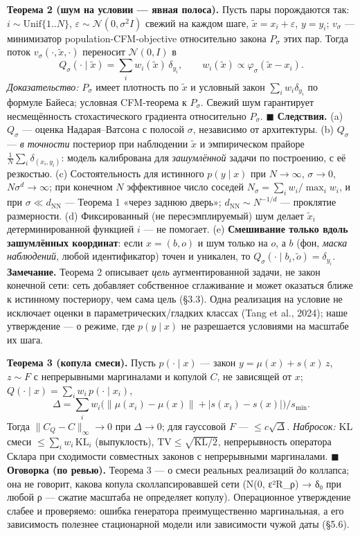 \documentclass[11pt]{article}
\begin{document}
\textbf{Теорема 2 (шум на условии — явная полоса).} Пусть пары порождаются так: $i \sim \mathrm{Unif}\{1..N\}$, $\varepsilon \sim \mathcal N(0, \sigma^2 I)$ свежий на каждом шаге, $\tilde x = x_i + \varepsilon$, $y = y_i$; $v_\sigma$ — минимизатор population-CFM-objective относительно закона $P_\sigma$ этих пар. Тогда поток $v_\sigma(\cdot, \tilde x, \cdot)$ переносит $\mathcal N(0, I)$ в \[Q_\sigma(\cdot\mid\tilde x) = \sum_i w_i(\tilde x)\,\delta_{y_i},\qquad w_i(\tilde x) \propto \varphi_\sigma(\tilde x - x_i).\] \emph{Доказательство:} $P_\sigma$ имеет плотность по $\tilde x$ и условный закон $\sum_i w_i \delta_{y_i}$ по формуле Байеса; условная CFM-теорема к $P_\sigma$. Свежий шум гарантирует несмещённость стохастического градиента относительно $P_\sigma$. $\blacksquare$ \textbf{Следствия.} (a) $Q_\sigma$ — оценка Надарая–Ватсона с полосой $\sigma$, независимо от архитектуры. (b) $Q_\sigma$ — \emph{в точности} постериор при наблюдении $\tilde x$ и эмпирическом прайоре $\frac1N\sum_i \delta_{(x_i, y_i)}$: модель калибрована для \emph{зашумлённой} задачи по построению, с её резкостью. (c) Состоятельность для истинного $p(y\mid x)$ при $N \to \infty$, $\sigma \to 0$, $N\sigma^d \to \infty$; при конечном $N$ эффективное число соседей $N_\sigma = \sum_i w_i / \max_i w_i$, и при $\sigma \ll d_{\mathrm{NN}}$ — Теорема 1 «через заднюю дверь»; $d_{\mathrm{NN}} \sim N^{-1/d}$ — проклятие размерности. (d) Фиксированный (не пересэмплируемый) шум делает $\tilde x_i$ детерминированной функцией $i$ — не помогает. (e) \textbf{Смешивание только вдоль зашумлённых координат}: если $x = (b, o)$ и шум только на $o$, а $b$ (фон, \emph{маска наблюдений}, любой идентификатор) точен и уникален, то $Q_\sigma(\cdot\mid b_i, \tilde o) = \delta_{y_i}$. \textbf{Замечание.} Теорема 2 описывает \emph{цель} аугментированной задачи, не закон конечной сети: сеть добавляет собственное сглаживание и может оказаться ближе к истинному постериору, чем сама цель (§3.3). Одна реализация на условие не исключает оценки в параметрических/гладких классах (Tang et al., 2024); наше утверждение — о режиме, где $p(y\mid x)$ не разрешается условиями на масштабе их шага.

\textbf{Теорема 3 (копула смеси).} Пусть $p(\cdot\mid x)$ — закон $y = \mu(x) + s(x)\,z$, $z \sim F$ с непрерывными маргиналами и копулой $C$, не зависящей от $x$; $Q(\cdot\mid x) = \sum_i w_i\, p(\cdot\mid x_i)$, \[\Delta = \sum_i w_i \big(\|\mu(x_i) - \mu(x)\| + |s(x_i) - s(x)|\big)/s_{\min}.\] Тогда $\|C_Q - C\|_\infty \to 0$ при $\Delta \to 0$; для гауссовой $F$ — $\le c\sqrt{\Delta}$. \emph{Набросок:} KL смеси $\le \sum_i w_i\,\mathrm{KL}_i$ (выпуклость), $\mathrm{TV} \le \sqrt{\mathrm{KL}/2}$, непрерывность оператора Склара при сходимости совместных законов с непрерывными маргиналами. $\blacksquare$ \textbf{Оговорка (по ревью).} Теорема 3 — о смеси реальных реализаций \emph{до} коллапса; она не говорит, какова копула сколлапсировавшей сети (N(0, {\symfont ε}²R\_{\symfont ρ}) {\symfont →} {\symfont δ₀} при любой {\symfont ρ} — сжатие масштаба не определяет копулу). Операционное утверждение слабее и проверяемо: ошибка генератора преимущественно маргинальная, а его зависимость полезнее стационарной модели или зависимости чужой даты (§5.6).
\end{document}
